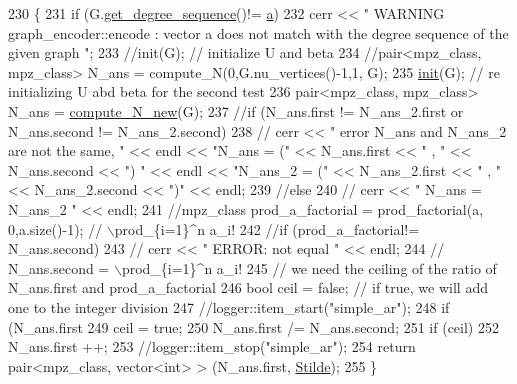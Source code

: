 \begin{DoxyCode}
230                                                                  \{
231   \textcolor{keywordflow}{if} (G.\hyperlink{classgraph_afdca627df7fb93a7d1d8a547f616e948}{get\_degree\_sequence}()!= \hyperlink{classgraph__encoder_a56eb5cf480ae5c2fca9f3a45f2ffd4f1}{a})
232     cerr << \textcolor{stringliteral}{" WARNING graph\_encoder::encode : vector a does not match with the degree sequence of the given
       graph "};
233   \textcolor{comment}{//init(G); // initialize U and beta }
234   \textcolor{comment}{//pair<mpz\_class, mpz\_class> N\_ans  = compute\_N(0,G.nu\_vertices()-1,1, G);}
235   \hyperlink{classgraph__encoder_a6cfb6fca4bc50d4e5d267060a91f43c3}{init}(G); \textcolor{comment}{// re initializing U abd beta for the second test}
236   pair<mpz\_class, mpz\_class> N\_ans = \hyperlink{classgraph__encoder_aeab221523400ec73da6146fdbbd11274}{compute\_N\_new}(G);
237   \textcolor{comment}{//if (N\_ans.first != N\_ans\_2.first or N\_ans.second != N\_ans\_2.second)}
238   \textcolor{comment}{//  cerr << " error N\_ans and N\_ans\_2 are not the same, "  << endl << "N\_ans = (" << N\_ans.first << " , "
       << N\_ans.second << ") " << endl << "N\_ans\_2 = (" << N\_ans\_2.first << " , " << N\_ans\_2.second << ")" <<
       endl;}
239   \textcolor{comment}{//else}
240   \textcolor{comment}{//  cerr << " N\_ans = N\_ans\_2 " << endl;}
241   \textcolor{comment}{//mpz\_class prod\_a\_factorial = prod\_factorial(a, 0,a.size()-1); // \(\backslash\)prod\_\{i=1\}^n a\_i!}
242   \textcolor{comment}{//if (prod\_a\_factorial!= N\_ans.second)}
243   \textcolor{comment}{//  cerr << " ERROR: not equal " << endl;}
244   \textcolor{comment}{// N\_ans.second = \(\backslash\)prod\_\{i=1\}^n a\_i!}
245   \textcolor{comment}{// we need the ceiling of the ratio of N\_ans.first and prod\_a\_factorial}
246   \textcolor{keywordtype}{bool} ceil = \textcolor{keyword}{false}; \textcolor{comment}{// if true, we will add one to the integer division}
247   \textcolor{comment}{//logger::item\_start("simple\_ar");}
248   \textcolor{keywordflow}{if} (N\_ans.first %
249     ceil = \textcolor{keyword}{true};
250   N\_ans.first /= N\_ans.second;
251   \textcolor{keywordflow}{if} (ceil)
252     N\_ans.first ++;
253   \textcolor{comment}{//logger::item\_stop("simple\_ar");}
254   \textcolor{keywordflow}{return} pair<mpz\_class, vector<int> > (N\_ans.first, \hyperlink{classgraph__encoder_a342688a3fdee511b7fae3f155cfb10cf}{Stilde});
255 \}
\end{DoxyCode}
\mbox{\label{classgraph__encoder_a6cfb6fca4bc50d4e5d267060a91f43c3}} 
